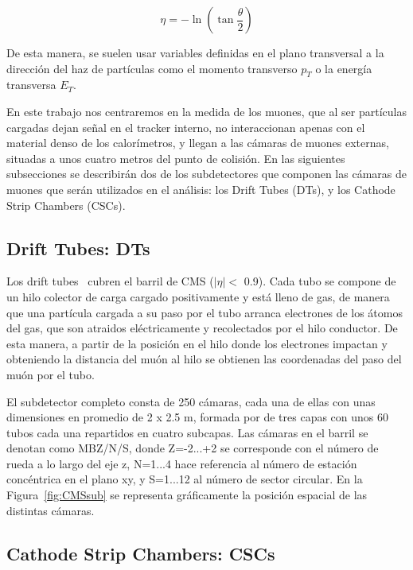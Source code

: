 \begin{equation}
  \eta = -\ln\left(\tan\dfrac{\theta}{2}\right)
\label{eq:eta}
\end{equation}


De esta manera, se suelen usar variables definidas en el plano transversal a la dirección del haz de partículas como el momento transverso $p_{T}$ o la energía transversa $E_{T}$. 

En este trabajo nos centraremos en la medida de los muones, que al ser part\'iculas cargadas dejan señal en el tracker interno, no interaccionan apenas con el material denso de los calor\'imetros, y llegan a las c\'amaras de muones externas, situadas a unos cuatro metros del punto de colisi\'on. En las siguientes subsecciones se describir\'an dos de los subdetectores que componen las c\'amaras de muones que ser\'an utilizados en el an\'alisis: los Drift Tubes (DTs), y los Cathode Strip Chambers (CSCs).

\subsection{Drift Tubes: DTs}\label{sec:DTs}

Los drift tubes~\cite{DTperformance} cubren el barril de CMS ($\lvert \eta \rvert <$ 0.9). Cada tubo se compone de un hilo colector de carga cargado positivamente y est\'a lleno de gas, de manera que una part\'icula cargada a su paso por el tubo arranca electrones de los \'atomos del gas, que son atraidos el\'ectricamente y recolectados por el hilo conductor. De esta manera, a partir de la posici\'on en el hilo donde los electrones impactan y obteniendo la distancia del mu\'on al hilo se obtienen las coordenadas del paso del mu\'on por el tubo.

El subdetector completo consta de 250 c\'amaras, cada una de ellas con unas dimensiones en promedio de 2 x 2.5 m, formada por de tres capas con unos 60 tubos cada una repartidos en cuatro subcapas. Las c\'amaras en el barril se denotan como MBZ/N/S, donde Z=-2...+2 se corresponde con el n\'umero de rueda a lo largo del eje z, N=1...4 hace referencia al n\'umero de estaci\'on conc\'entrica en el plano xy, y S=1...12 al n\'umero de sector circular. En la Figura~\ref{fig:CMSsub} se representa gr\'aficamente la posici\'on espacial de las distintas c\'amaras.


\subsection{Cathode Strip Chambers: CSCs}\label{sec:CSCs}

